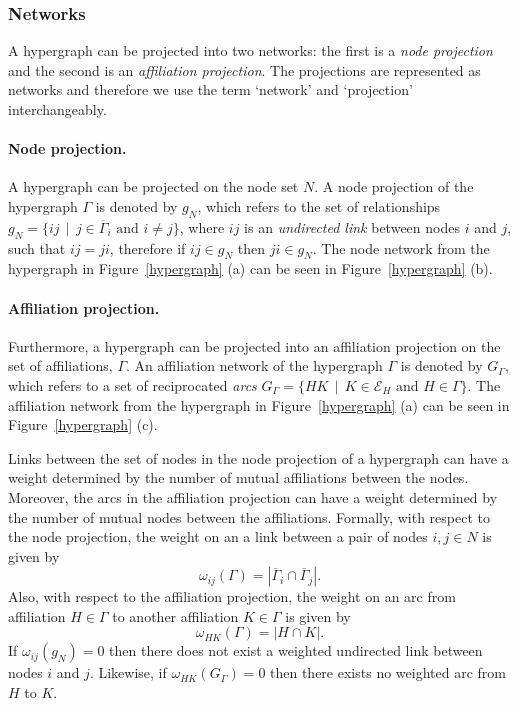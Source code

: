 \subsubsection*{Networks}

A hypergraph can be projected into two networks: the first is a \emph{node projection} and the second is an \emph{affiliation projection}. The projections are represented as networks and therefore we use the term `network' and `projection' interchangeably.

\paragraph{Node projection.}

A hypergraph can be projected on the node set $N$. A node projection of the hypergraph $\Gamma$ is denoted by $g_N$, which refers to the set of relationships $g_N = \{ij \, \mid \, j \in \overline{\Gamma}_{i} \mbox{ and } i \neq j \}$, where $ij$ is an \emph{undirected link} between nodes $i$ and $j$, such that $ij = ji$, therefore if $ij \in g_{N}$ then $ji \in g_{N}$. The node network from the hypergraph in Figure~\ref{hypergraph} (a) can be seen in Figure~\ref{hypergraph} (b).

\paragraph{Affiliation projection.}

Furthermore, a hypergraph can be projected into an affiliation projection on the set of affiliations, $\Gamma$. An affiliation network of the hypergraph $\Gamma$ is denoted by $G_{\Gamma}$, which refers to a set of reciprocated \emph{arcs} $G_{\Gamma} = \{ HK \, \mid \, K \in \mathcal{E}_{H} \mbox{ and } H \in \Gamma \}$. The affiliation network from the hypergraph in Figure~\ref{hypergraph} (a) can be seen in Figure~\ref{hypergraph} (c).

Links between the set of nodes in the node projection of a hypergraph can have a weight determined by the number of mutual affiliations between the nodes. Moreover, the arcs in the affiliation projection can have a weight determined by the number of mutual nodes between the affiliations. Formally, with respect to the node projection, the weight on an a link between a pair of nodes $i,j \in N$ is given by
\begin{equation} \label{eq:nodeweight}
\omega_{ij}(\Gamma) = | \overline{\Gamma}_{i} \cap \overline{\Gamma}_{j} | .
\end{equation}
Also, with respect to the affiliation projection, the weight on an arc from affiliation $H \in \Gamma$ to another affiliation $K \in \Gamma$ is given by
\begin{equation} \label{eq:affweight}
\omega_{HK}(\Gamma) = | H \cap K | .
\end{equation}
If $\omega_{ij}(g_{N}) = 0$ then there does not exist a weighted undirected link between nodes $i$ and $j$. Likewise, if $\omega_{HK}(G_{\Gamma}) = 0$ then there exists no weighted arc from $H$ to $K$.

